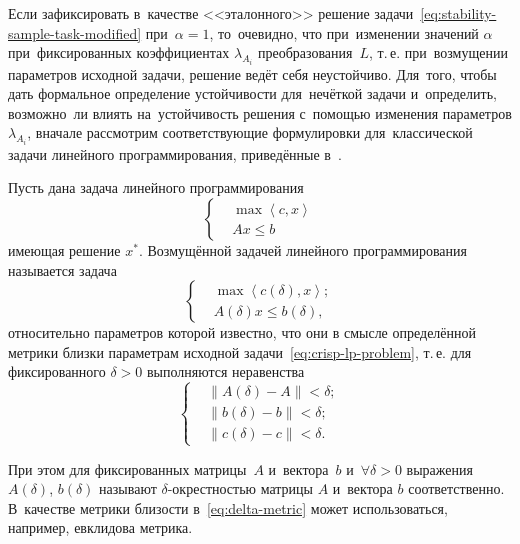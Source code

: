 Если зафиксировать в~качестве <<эталонного>> решение задачи~\eqref{eq:stability-sample-task-modified} при~$\alpha=1$, то~очевидно, что при~изменении значений $\alpha$ при~фиксированных коэффициентах $\lambda_{A_i}$ преобразования~$L$, т.\,е. при~возмущении параметров исходной задачи, решение ведёт себя неустойчиво. Для~того, чтобы дать формальное определение устойчивости для~нечёткой задачи и~определить, возможно~ли влиять на~устойчивость решения с~помощью изменения параметров $\lambda_{A_i}$, вначале рассмотрим соответствующие формулировки для~классической задачи линейного программирования, приведённые в~\cite{Ashmanov}.

Пусть дана задача линейного программирования
\begin{equation}
\label{eq:crisp-lp-problem}
  \left\{ \begin{aligned}
    & \max \left\langle c,x \right\rangle \\ 
    & Ax\leqslant b
  \end{aligned} \right.
\end{equation}
имеющая решение $x^{*}$. Возмущённой задачей линейного программирования называется задача
\begin{equation}
\label{eq:crisp-lp-problem-unstable}
  \left\{ \begin{aligned}
    & \max \left\langle c\left(\delta \right),x \right\rangle; \\ 
    & A\left( \delta  \right)x\leqslant b\left(\delta \right),
  \end{aligned} \right.
\end{equation}
относительно параметров которой известно, что они в смысле определённой метрики близки параметрам исходной задачи~\eqref{eq:crisp-lp-problem}, т.\,е. для фиксированного $\delta>0$ выполняются неравенства
\begin{equation}
\label{eq:delta-metric}
  \left\{ \begin{aligned}
    & \left\| A\left( \delta  \right)-A \right\|<\delta; \\ 
    & \left\| b\left( \delta  \right)-b \right\|<\delta; \\ 
    & \left\| c\left( \delta  \right)-c \right\|<\delta.
  \end{aligned} \right.
\end{equation}

При этом для фиксированных матрицы~$A$ и~вектора~$b$ и~$\forall \delta >\text{0}$ выражения $A\left(\delta \right)$, $b\left(\delta \right)$ называют $\delta$-окрестностью матрицы $A$ и~вектора $b$ соответственно. В~качестве метрики близости в~\eqref{eq:delta-metric} может использоваться, например, евклидова метрика.

